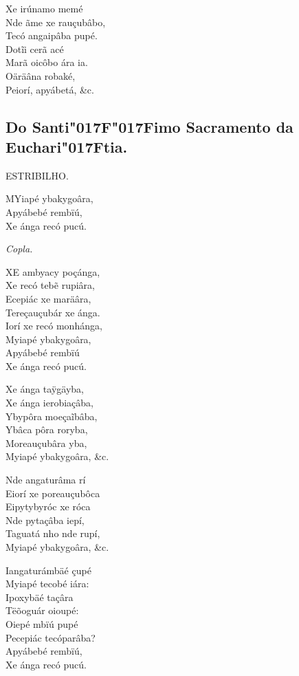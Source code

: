 \documentclass[openany,titlepage,12pt]{book}
\newcommand{\lgS}{\char"017F}
\newcommand{\lgSS}{\char"017F\char"017F}
\begin{document}
Xe irúnamo memé\\
Nde ãme xe rauçubâbo,\\
Tecó angaipâba pupé.\\
Dotĩi cerã acé\\
Marã oicôbo ára ia.\\
Oäräâna robaké,\\
Peiorí, apyábetá, \&c.

\subsection{Do Santi\lgSS imo Sacramento da Euchari\lgS tia.}
\begin{center}
    ESTRIBILHO.
\end{center}

\lettrine[findent =4pt, nindent=0pt, lines=2]
{M}{Y}iapé ybakygoâra,\\
Apyábebé rembïú,\\
Xe ánga recó pucú.

\begin{center}
    \textit{Copla.}
\end{center}

\lettrine[findent =4pt, nindent=0pt, lines=2]
{X}{E} ambyacy poçánga,\\
Xe recó tebẽ rupiâra,\\
Ecepiác xe maräâra,\\
Tereçauçubár xe ánga.\\
Iorí xe recó monhánga,\\
Myiapé ybakygoâra,\\
Apyábebé rembïú\\%
Xe ánga recó pucú.

Xe ánga taÿgäyba,\\
Xe ánga ierobiaçâba,\\
Ybypôra moeçaĩbâba,\\
Ybâca pôra roryba,\\
Moreauçubâra yba,\\
Myiapé ybakygoâra, \&c.

Nde angaturâma rí\\
Eiorí xe poreauçubôca\\
Eipytybyróc xe róca\\
Nde pytaçâba iepí,\\
Taguatá nho nde rupí,\\
Myiapé ybakygoâra, \&c.

Iangaturámbäé çupé\\
Myiapé tecobé iára:\\
Ipoxybäé taçâra\\
Tëõoguár oioupé:\\
Oiepé mbïú pupé\\
Pecepiác tecóparâba?\\
Apyábebé rembïú,\\
Xe ánga recó pucú.
\newpage
\end{document}
